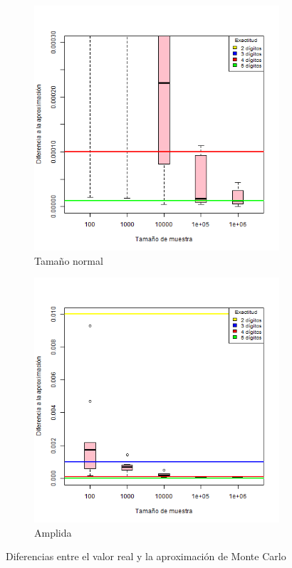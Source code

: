 \documentclass{article}
\begin{document}
\begin{figure}[H]
       \centering
       \begin{subfigure}[b]{0.85\linewidth}
           \includegraphics[width=\linewidth]{Grafica1.png}
           \caption{Tama\~no normal}
           \label{f1.a}
        \end{subfigure}
        \begin{subfigure}[b]{0.85\linewidth}
            \includegraphics[width=\linewidth]{Grafica1.1.png}
            \caption{Amplida}
            \label{f1.b}
        \end{subfigure}
\caption{Diferencias entre el valor real y la aproximaci\'on de Monte Carlo}
        \label{f1}
\end{figure}
\end{document}
